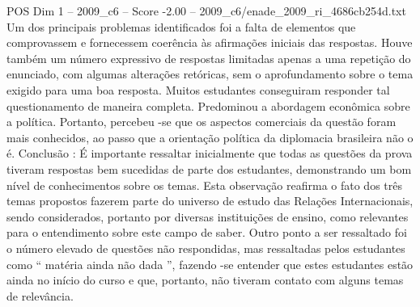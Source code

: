 \begin{textsample}{POS Dim 1 – 2009\_c6 – Score -2.00 – 2009\_c6/enade\_2009\_ri\_4686cb254d.txt}
Um dos principais problemas identificados foi a falta de elementos que comprovassem e fornecessem coerência às afirmações iniciais das respostas.
Houve também um número expressivo de respostas limitadas apenas a uma repetição do enunciado, com algumas alterações retóricas, sem o aprofundamento sobre o tema exigido para uma boa resposta.
Muitos estudantes conseguiram responder tal questionamento de maneira completa.
Predominou a abordagem econômica sobre a política.
Portanto, percebeu -se que os aspectos comerciais da questão foram mais conhecidos, ao passo que a orientação política da diplomacia brasileira não o é.
Conclusão : É importante ressaltar inicialmente que todas as questões da prova tiveram respostas bem sucedidas de parte dos estudantes, demonstrando um bom nível de conhecimentos sobre os temas.
Esta observação reafirma o fato dos três temas propostos fazerem parte do universo de estudo das Relações Internacionais, sendo considerados, portanto por diversas instituições de ensino, como relevantes para o entendimento sobre este campo de saber.
Outro ponto a ser ressaltado foi o número elevado de questões não respondidas, mas ressaltadas pelos estudantes como “ matéria ainda não dada ”, fazendo -se entender que estes estudantes estão ainda no início do curso e que, portanto, não tiveram contato com alguns temas de relevância.

\end{textsample}
